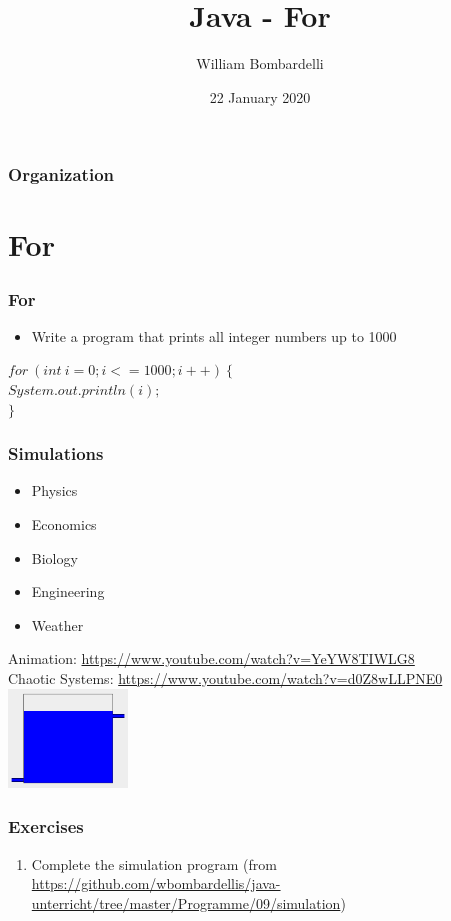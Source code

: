 \documentclass{beamer}
\title[Java]{Java - For}
\author[W. Bombardelli]{William Bombardelli}
\institute[Schweizerschule Mexiko]
{
	\vskip 12pt
	Schweizerschule Mexiko, Ciudad de México, Mexico \\
	\texttt{\url{https://github.com/wbombardellis/java-unterricht}}
}
\date{22 January 2020}
\newcommand{\cindent}{\hskip20pt}
\begin{document}
	\begin{frame}
		\titlepage
	\end{frame}
	
	\begin{frame}
		\frametitle{Organization}
		\tableofcontents
	\end{frame}

	\section{For}
	\begin{frame}
		\frametitle{For}
		\begin{itemize}
			\item Write a program that prints all integer numbers up to 1000
		\end{itemize}
		\pause
		$for\ (int\ i = 0; i <= 1000; i++)\ \{$\\
			\cindent $System.out.println(i);$\\
		$\}$\\
	\end{frame}

	\begin{frame}
		\frametitle{Simulations}
		\begin{itemize}
			\item Physics
			\item Economics
			\item Biology
			\item Engineering
			\item Weather
		\end{itemize}
		\pause
		Animation: \url{https://www.youtube.com/watch?v=YeYW8TIWLG8}\\
		Chaotic Systems: \url{https://www.youtube.com/watch?v=d0Z8wLLPNE0}\\
		\pause
		\centering
		\includegraphics[width=90pt]{tank.png}
	\end{frame}

	\begin{frame}
		\frametitle{Exercises}
		\begin{enumerate}
			\item Complete the simulation program (from \url{https://github.com/wbombardellis/java-unterricht/tree/master/Programme/09/simulation})
		\end{enumerate}
	\end{frame}
\end{document}
